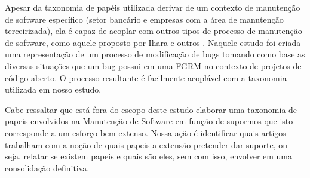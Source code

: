 Apesar da taxonomia de papéis utilizada derivar de um contexto de manutenção de
software específico (setor bancário e empresas com a área de manutenção
terceirizada), ela é capaz de acoplar com outros tipos de processo de manutenção
de software, como aquele proposto por Ihara e outros
\cite{Ihara:2009:AMI:1595808.1595833}. Naquele estudo foi criada uma
representação de um processo de modificação de bugs tomando como base as
diversas situações que um bug possui em uma FGRM no contexto de projetos de
código aberto. O processo resultante é facilmente acoplável com a taxonomia
utilizada em nosso estudo.

Cabe ressaltar que está fora do escopo deste estudo elaborar uma taxonomia de
papeis envolvidos na Manutenção de Software em função de supormos que isto
corresponde a um esforço bem extenso. Nossa ação é identificar quais artigos
trabalham com a noção de quais papeis a extensão pretender dar suporte,  ou
seja,  relatar se existem papeis e quais são eles,  sem com isso, envolver em
uma consolidação definitiva.





